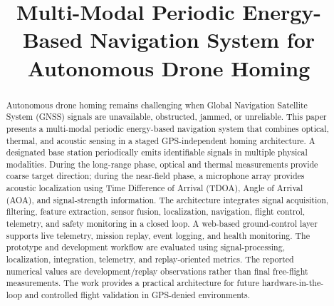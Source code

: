 \documentclass[conference]{IEEEtran}
\begin{document}
\title{Multi-Modal Periodic Energy-Based Navigation System for Autonomous Drone Homing}

\author{
\and
{}
}

\maketitle

\begin{abstract}
Autonomous drone homing remains challenging when Global Navigation Satellite
System (GNSS) signals are unavailable, obstructed, jammed, or unreliable.
This paper presents a multi-modal periodic energy-based navigation system that
combines optical, thermal, and acoustic sensing in a staged GPS-independent
homing architecture. A designated base station periodically emits identifiable
signals in multiple physical modalities. During the long-range phase, optical
and thermal measurements provide coarse target direction; during the near-field
phase, a microphone array provides acoustic localization using Time Difference
of Arrival (TDOA), Angle of Arrival (AOA), and signal-strength information.
The architecture integrates signal acquisition, filtering, feature extraction,
sensor fusion, localization, navigation, flight control, telemetry, and safety
monitoring in a closed loop. A web-based ground-control layer supports live
telemetry, mission replay, event logging, and health monitoring. The prototype
and development workflow are evaluated using signal-processing, localization,
integration, telemetry, and replay-oriented metrics. The reported numerical
values are development/replay observations rather than final free-flight
measurements. The work provides a practical architecture for future
hardware-in-the-loop and controlled flight validation in GPS-denied environments.
\end{abstract}
\end{document}
